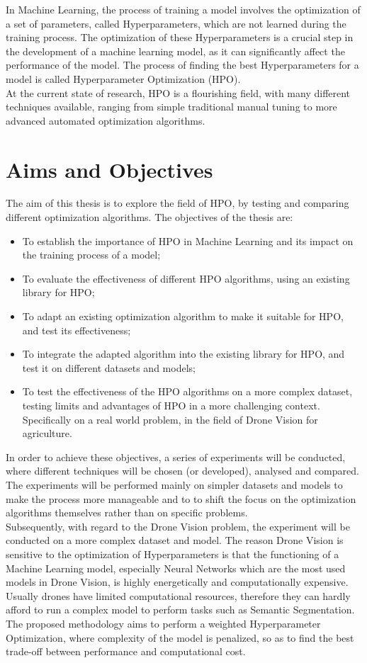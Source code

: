 In Machine Learning, the process of training a model involves the optimization of a set of parameters, called Hyperparameters, which are not learned during the training process. The optimization of these Hyperparameters is a crucial step in the development of a machine learning model, as it can significantly affect the performance of the model. The process of finding the best Hyperparameters for a model is called Hyperparameter Optimization (HPO).
\\[0.3cm]At the current state of research, HPO is a flourishing field, with many different techniques available, ranging from simple traditional manual tuning to more advanced automated optimization algorithms.

\section{Aims and Objectives}

The aim of this thesis is to explore the field of HPO, by testing and comparing different optimization algorithms.
The objectives of the thesis are:
\begin{itemize}[itemsep=0.1cm]
	\item To establish the importance of HPO in Machine Learning and its impact on the training process of a model;
	\item To evaluate the effectiveness of different HPO algorithms, using an existing library for HPO;
	\item To adapt an existing optimization algorithm to make it suitable for HPO, and test its effectiveness;
	\item To integrate the adapted algorithm into the existing library for HPO, and test it on different datasets and models;
	\item To test the effectiveness of the HPO algorithms on a more complex dataset, testing limits and advantages of HPO in a more challenging context. Specifically on a real world problem, in the field of Drone Vision for agriculture.
\end{itemize}
In order to achieve these objectives, a series of experiments will be conducted, where different techniques will be chosen (or developed), analysed and compared. The experiments will be performed mainly on simpler datasets and models to make the process more manageable and to to shift the focus on the optimization algorithms themselves rather than on specific problems.
\\[0.3cm]Subsequently, with regard to the Drone Vision problem, the experiment will be conducted on a more complex dataset and model. The reason Drone Vision is sensitive to the optimization of Hyperparameters is that the functioning of a Machine Learning model, especially Neural Networks which are the most used models in Drone Vision, is highly energetically and computationally expensive. Usually drones have limited computational resources, therefore they can hardly afford to run a complex model to perform tasks such as Semantic Segmentation. The proposed methodology aims to perform a weighted Hyperparameter Optimization, where complexity of the model is penalized, so as to find the best trade-off between performance and computational cost. 

